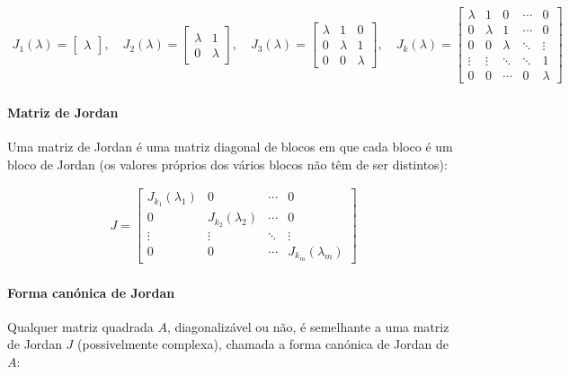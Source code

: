 \documentclass{article}
\begin{document}
\begin{gather*}
J_1(\lambda) =
\begin{bmatrix}
\lambda
\end{bmatrix},
\quad
J_2(\lambda) =
\begin{bmatrix}
\lambda & 1 \\
0 & \lambda
\end{bmatrix},
\quad
J_3(\lambda) =
\begin{bmatrix}
\lambda & 1 & 0 \\
0 & \lambda & 1 \\
0 & 0 & \lambda
\end{bmatrix},
\quad
J_k(\lambda) =
\begin{bmatrix}
\lambda & 1 & 0 & \cdots & 0 \\
0 & \lambda & 1 & \cdots & 0 \\
0 & 0 & \lambda & \ddots & \vdots \\
\vdots & \vdots & \ddots & \ddots & 1 \\
0 & 0 & \cdots & 0 & \lambda
\end{bmatrix}
\end{gather*}

\paragraph{Matriz de Jordan}

Uma matriz de Jordan é uma matriz diagonal de blocos em que cada bloco é um bloco de Jordan
(os valores próprios dos vários blocos não têm de ser distintos):

\begin{gather*}
J =
\begin{bmatrix}
J_{k_1}(\lambda_1) & 0 & \cdots & 0 \\
0 & J_{k_2}(\lambda_2) & \cdots & 0 \\
\vdots & \vdots & \ddots & \vdots \\
0 & 0 & \cdots & J_{k_m}(\lambda_m)
\end{bmatrix}
\end{gather*}

\paragraph{Forma canónica de Jordan}

Qualquer matriz quadrada $A$, diagonalizável ou não, é semelhante a uma matriz de Jordan $J$ (possivelmente
complexa), chamada a forma canónica de Jordan de $A$:
\end{document}
